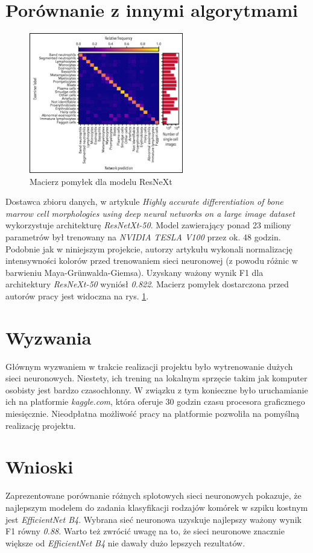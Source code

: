\section{Porównanie z innymi algorytmami}

\begin{figure}
    \centering
    \includegraphics[width=0.6\textwidth]{resnext_confusion_matrix}
    \caption{Macierz pomyłek dla modelu ResNeXt \cite{resnext}}
    \label{fig:resnext_confusion_matrix}
\end{figure}

Dostawca zbioru danych, w artykule \textit{Highly accurate differentiation of bone marrow cell morphologies using deep neural networks on a large image dataset} \cite{resnext} wykorzystuje architekturę \textit{ResNetXt-50}.
Model zawierający ponad 23 miliony parametrów był trenowany na \textit{NVIDIA TESLA V100} przez ok. 48 godzin.
Podobnie jak w niniejszym projekcie, autorzy artykułu wykonali normalizację intensywności kolorów przed trenowaniem sieci neuronowej (z powodu różnic w barwieniu Maya-Grünwalda-Giemsa).
Uzyskany ważony wynik F1 dla architektury \textit{ResNeXt-50} wyniósł \textit{0.822}.
Macierz pomyłek dostarczona przed autorów pracy jest widoczna na rys. \ref{fig:resnext_confusion_matrix}.


\section{Wyzwania}

Głównym wyzwaniem w trakcie realizacji projektu było wytrenowanie dużych sieci neuronowych.
Niestety, ich trening na lokalnym sprzęcie takim jak komputer osobisty jest bardzo czasochłonny.
W związku z tym konieczne było uruchamianie ich na platformie \textit{kaggle.com}, która oferuje 30 godzin czasu procesora graficznego miesięcznie.
Nieodpłatna możliwość pracy na platformie pozwoliła na pomyślną realizację projektu.


\section{Wnioski}

Zaprezentowane porównanie różnych splotowych sieci neuronowych pokazuje, że najlepszym modelem do zadania klasyfikacji rodzajów komórek w szpiku kostnym jest \textit{EfficientNet B4}.
Wybrana sieć neuronowa uzyskuje najlepszy ważony wynik F1 równy \textit{0.88}.
Warto też zwrócić uwagę na to, że sieci neuronowe znacznie większe od \textit{EfficientNet B4} nie dawały dużo lepszych rezultatów.

